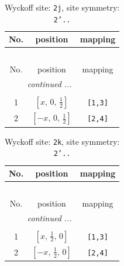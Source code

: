 \documentclass[fleqn,8pt]{jsarticle}
\begin{document}
\renewcommand{\arraystretch}{1.2}
\begin{longtable}{ccc}
\caption{Wyckoff site: {\tt 2j}, site symmetry: {\tt 2'..}}
 \\
 \hline \hline
No. & position & mapping \\ \hline \endfirsthead

\multicolumn{2}{l}{\tablename\ \thetable{}} \\
 \hline \hline
No. & position & mapping \\ \hline \endhead

 \hline \hline
\multicolumn{2}{r}{\footnotesize\it continued ...} \\ \endfoot

 \hline \hline
\multicolumn{2}{r}{} \\ \endlastfoot

1 & $\left[ x,\, 0,\, \frac{1}{2} \right]$ & {\tt [1,3]} \\ \hline
2 & $\left[ - x,\, 0,\, \frac{1}{2} \right]$ & {\tt [2,4]} \\
\end{longtable}
\renewcommand{\arraystretch}{1.2}
\begin{longtable}{ccc}
\caption{Wyckoff site: {\tt 2k}, site symmetry: {\tt 2'..}}
 \\
 \hline \hline
No. & position & mapping \\ \hline \endfirsthead

\multicolumn{2}{l}{\tablename\ \thetable{}} \\
 \hline \hline
No. & position & mapping \\ \hline \endhead

 \hline \hline
\multicolumn{2}{r}{\footnotesize\it continued ...} \\ \endfoot

 \hline \hline
\multicolumn{2}{r}{} \\ \endlastfoot

1 & $\left[ x,\, \frac{1}{2},\, 0 \right]$ & {\tt [1,3]} \\ \hline
2 & $\left[ - x,\, \frac{1}{2},\, 0 \right]$ & {\tt [2,4]} \\
\end{longtable}
\renewcommand{\arraystretch}{1.2}
\end{document}
